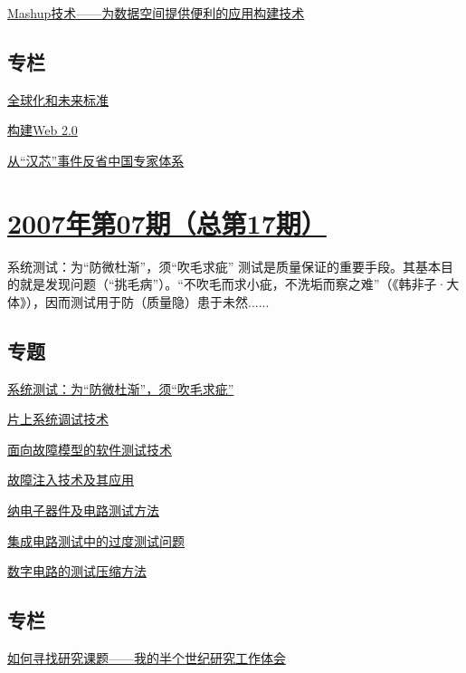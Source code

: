 \documentclass[a4paper]{article}
\begin{document}
\href{http://history.ccf.org.cn/resources/1190201776262/2010/04/15/018066.pdf}{Mashup技术——为数据空间提供便利的应用构建技术}

\subsection{专栏}
\href{http://history.ccf.org.cn/resources/1190201776262/2010/04/15/018070.pdf}{全球化和未来标准}

\href{http://history.ccf.org.cn/resources/1190201776262/2010/04/15/018074.pdf}{构建Web 2.0}

\href{http://history.ccf.org.cn/resources/1190201776262/2010/04/15/018077.pdf}{从“汉芯”事件反省中国专家体系}


\section{\href{http://history.ccf.org.cn/sites/ccf/jsjtbbd.jsp?contentId=2542567628968}{\textbf{2007年第07期（总第17期）}}}
系统测试：为“防微杜渐”，须“吹毛求疵” 测试是质量保证的重要手段。其基本目的就是发现问题（“挑毛病”）。“不吹毛而求小疵，不洗垢而察之难”（《韩非子·大体》），因而测试用于防（质量隐）患于未然......
\subsection{专题}
\href{http://history.ccf.org.cn/resources/1190201776262/2010/04/15/017016.pdf}{系统测试：为“防微杜渐”，须“吹毛求疵”}

\href{http://history.ccf.org.cn/resources/1190201776262/2010/04/15/017018.pdf}{片上系统调试技术}

\href{http://history.ccf.org.cn/resources/1190201776262/2010/04/15/017025.pdf}{面向故障模型的软件测试技术}

\href{http://history.ccf.org.cn/resources/1190201776262/2010/04/15/017032.pdf}{故障注入技术及其应用}

\href{http://history.ccf.org.cn/resources/1190201776262/2010/04/15/017042.pdf}{纳电子器件及电路测试方法}

\href{http://history.ccf.org.cn/resources/1190201776262/2010/04/15/017050.pdf}{集成电路测试中的过度测试问题}

\href{http://history.ccf.org.cn/resources/1190201776262/2010/04/15/017057.pdf}{数字电路的测试压缩方法}

\subsection{专栏}
\href{http://history.ccf.org.cn/resources/1190201776262/2010/04/15/017066.pdf}{如何寻找研究课题——我的半个世纪研究工作体会}
\end{document}
